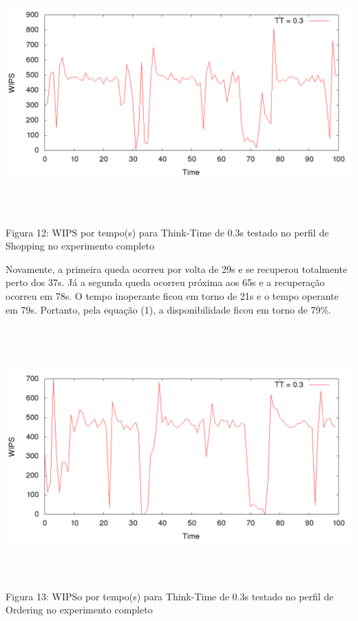 \documentclass[11pt,twoside]{article}
\begin{document}
\begin{center}
\includegraphics[width=15cm, height=10cm]{images/completo/plot_shopping_TT03.png}
Figura 12: WIPS por tempo(s) para Think-Time de 0.3s testado no perfil de Shopping no experimento completo
\end{center}

Novamente, a primeira queda ocorreu por volta de 29s e se recuperou totalmente perto dos 37s. Já a segunda queda ocorreu próxima aos 65s e a recuperação ocorreu em 78s. O tempo inoperante ficou em torno de 21s e o tempo operante em 79s. Portanto, pela equação (1), a disponibilidade ficou em torno de 79\%.

\begin{center}
\includegraphics[width=15cm, height=10cm]{images/completo/plot_ordering_TT03.png}
Figura 13: WIPSo por tempo(s) para Think-Time de 0.3s testado no perfil de Ordering no experimento completo
\end{center}
\end{document}
